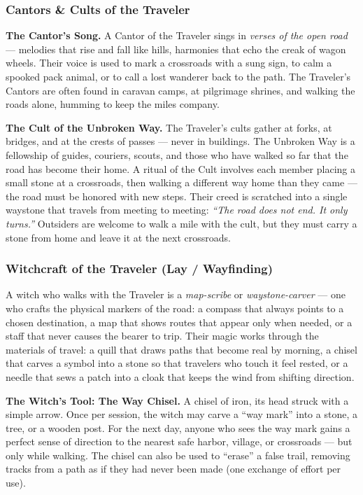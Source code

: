 \subsubsection*{Cantors \& Cults of the Traveler}

\textbf{The Cantor's Song.} A Cantor of the Traveler sings in \textit{verses of the open road} --- melodies that rise and fall like hills, harmonies that echo the creak of wagon wheels. Their voice is used to mark a crossroads with a sung sign, to calm a spooked pack animal, or to call a lost wanderer back to the path. The Traveler's Cantors are often found in caravan camps, at pilgrimage shrines, and walking the roads alone, humming to keep the miles company.

\textbf{The Cult of the Unbroken Way.} The Traveler's cults gather at forks, at bridges, and at the crests of passes --- never in buildings. The Unbroken Way is a fellowship of guides, couriers, scouts, and those who have walked so far that the road has become their home. A ritual of the Cult involves each member placing a small stone at a crossroads, then walking a different way home than they came --- the road must be honored with new steps. Their creed is scratched into a single waystone that travels from meeting to meeting: \textit{``The road does not end. It only turns.''} Outsiders are welcome to walk a mile with the cult, but they must carry a stone from home and leave it at the next crossroads.

\subsubsection*{Witchcraft of the Traveler (Lay / Wayfinding)}

A witch who walks with the Traveler is a \textit{map-scribe} or \textit{waystone-carver} --- one who crafts the physical markers of the road: a compass that always points to a chosen destination, a map that shows routes that appear only when needed, or a staff that never causes the bearer to trip. Their magic works through the materials of travel: a quill that draws paths that become real by morning, a chisel that carves a symbol into a stone so that travelers who touch it feel rested, or a needle that sews a patch into a cloak that keeps the wind from shifting direction.

\textbf{The Witch's Tool: The Way Chisel.} A chisel of iron, its head struck with a simple arrow. Once per session, the witch may carve a ``way mark'' into a stone, a tree, or a wooden post. For the next day, anyone who sees the way mark gains a perfect sense of direction to the nearest safe harbor, village, or crossroads --- but only while walking. The chisel can also be used to ``erase'' a false trail, removing tracks from a path as if they had never been made (one exchange of effort per use).

